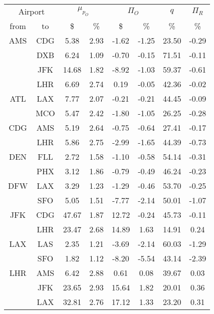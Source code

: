 \begin{table}
\begin{center}
\begin{tabular}{c c | c c | c c | c | c }
\toprule
\multicolumn{2}{c|}{Airport}  &  \multicolumn{2}{c|}{$\mu_{p_O}$} & \multicolumn{2}{c|}{$\Pi_O$}  &  $q$  & $\Pi_R$ \\[.4ex]
from  &  to  &  \$  & \%  &  \$  & \%  & \%  & \% \\
    \midrule
AMS  &  CDG  &    5.38  &  2.93  &   -1.62  &  -1.25  &  23.50  &  -0.29 \\
~    &  DXB  &    6.24  &  1.09  &   -0.70  &  -0.15  &  71.51  &  -0.11 \\
~    &  JFK  &   14.68  &  1.82  &   -8.92  &  -1.03  &  59.37  &  -0.61 \\
~    &  LHR  &    6.69  &  2.74  &    0.19  &  -0.05  &  42.36  &  -0.02 \\[.5ex]
ATL  &  LAX  &    7.77  &  2.07  &   -0.21  &  -0.21  &  44.45  &  -0.09 \\
~    &  MCO  &    5.47  &  2.42  &   -1.80  &  -1.05  &  26.25  &  -0.28 \\[.5ex]
CDG  &  AMS  &    5.19  &  2.64  &   -0.75  &  -0.64  &  27.41  &  -0.17 \\
~    &  LHR  &    5.86  &  2.75  &   -2.99  &  -1.65  &  44.39  &  -0.73 \\[.5ex]
DEN  &  FLL  &    2.72  &  1.58  &   -1.10  &  -0.58  &  54.14  &  -0.31 \\
~    &  PHX  &    3.12  &  1.86  &   -0.79  &  -0.49  &  46.24  &  -0.23 \\[.5ex]
DFW  &  LAX  &    3.29  &  1.23  &   -1.29  &  -0.46  &  53.70  &  -0.25 \\
~    &  SFO  &    5.05  &  1.51  &   -7.77  &  -2.14  &  50.01  &  -1.07 \\[.5ex]
JFK  &  CDG  &   47.67  &  1.87  &   12.72  &  -0.24  &  45.73  &  -0.11 \\
~    &  LHR  &   23.47  &  2.68  &   14.89  &  1.63  &  14.91  &  0.24 \\[.5ex]
LAX  &  LAS  &    2.35  &  1.21  &   -3.69  &  -2.14  &  60.03  &  -1.29 \\
~    &  SFO  &    1.82  &  1.12  &   -8.20  &  -5.54  &  43.14  &  -2.39 \\[.5ex]
LHR  &  AMS  &    6.42  &  2.88  &    0.61  &  0.08  &  39.67  &  0.03 \\
~    &  JFK  &   23.65  &  2.93  &   15.64  &  1.82  &  20.01  &  0.36 \\
~    &  LAX  &   32.81  &  2.76  &   17.12  &  1.33  &  23.20  &  0.31 \\

\end{tabular}
\end{center}
\end{table}
